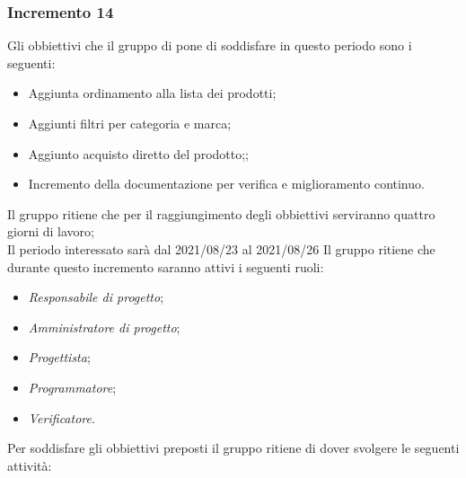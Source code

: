 \subsubsection{Incremento 14}
Gli obbiettivi che il gruppo di pone di soddisfare in questo periodo sono i seguenti:
\begin{itemize}
    \item Aggiunta ordinamento alla lista dei prodotti;
    \item Aggiunti filtri per categoria e marca;
    \item Aggiunto acquisto diretto del prodotto;;
    \item Incremento della documentazione per verifica e miglioramento continuo.
\end{itemize}
Il gruppo ritiene che per il raggiungimento degli obbiettivi serviranno quattro giorni di lavoro;\\
Il periodo interessato sarà dal 2021/08/23 al 2021/08/26
Il gruppo ritiene che durante questo incremento saranno attivi i seguenti ruoli:
\begin{itemize}
    \item \textit{Responsabile di progetto};
    \item \textit{Amministratore di progetto};
    \item \textit{Progettista};
    \item \textit{Programmatore};
    \item \textit{Verificatore}.
\end{itemize}
Per soddisfare gli obbiettivi preposti il gruppo ritiene di dover svolgere le seguenti attività:

